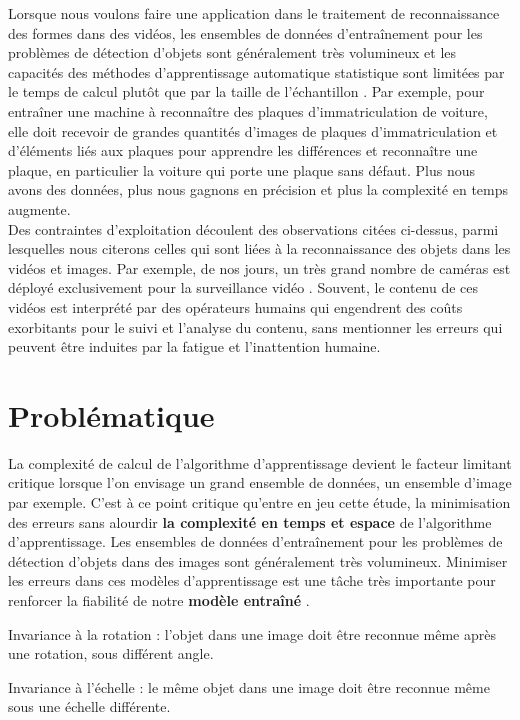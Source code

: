		Lorsque nous voulons faire une application dans le traitement de reconnaissance des formes dans des vidéos, les ensembles de données d'entraînement pour les  problèmes de détection d'objets sont généralement très volumineux et les capacités des méthodes d'apprentissage automatique statistique sont limitées par le temps de calcul plutôt que par la taille de l'échantillon \cite{bottou2010large}.
		Par exemple, pour entraîner une machine à reconnaître des plaques d'immatriculation de voiture, elle doit recevoir de grandes quantités d'images de plaques d'immatriculation et d'éléments liés aux plaques pour apprendre les différences et reconnaître une plaque, en particulier la voiture qui porte une plaque sans défaut. Plus nous avons des données, plus nous gagnons en précision et plus la complexité en temps augmente.\\
		Des contraintes d'exploitation découlent des observations citées ci-dessus, parmi lesquelles nous citerons celles qui sont liées à la reconnaissance des objets dans les vidéos et images. Par exemple, de nos jours, un très grand nombre de caméras est déployé exclusivement pour la surveillance vidéo \cite{ahadjitse2013reconnaissance} . Souvent, le contenu de ces vidéos est interprété par des opérateurs humains qui engendrent des coûts exorbitants pour le suivi et l'analyse du contenu, sans mentionner les erreurs qui peuvent être induites par la fatigue et l'inattention humaine. 
		
	
	\section{Problématique}
		La complexité de calcul de l'algorithme d'apprentissage devient le facteur limitant critique lorsque l'on envisage un grand ensemble de données, un ensemble d’image par exemple. C'est à ce point critique qu'entre en jeu cette étude, la minimisation des erreurs sans alourdir \textbf{la complexité en temps et espace} de l’algorithme d’apprentissage.   
		Les ensembles de données d'entraînement pour les problèmes de détection d'objets dans des images sont généralement très volumineux. Minimiser les erreurs dans ces modèles d’apprentissage est une tâche très importante pour renforcer la fiabilité de notre \textbf{modèle entraîné} \cite{ibm2018ml}. 
		
		\begin{list}{--}{Les modèles entraînés doivent être invariants sous des transformations géométriques et qualités des objets observés.}
			\item Invariance à la rotation : l'objet dans une image doit être reconnue même après une rotation, sous  différent angle.
			\item Invariance à l'échelle : le même objet dans une image doit être reconnue même sous une échelle différente.
		\end{list}
		
